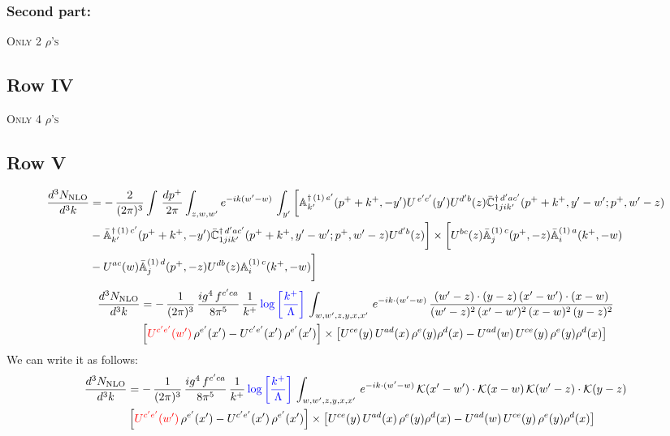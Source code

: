 \documentclass[9pt]{article}
\def\mf#1{\mathbb{#1}}
\newcommand{\chg}[1]{{\color{red}#1}}
\numberwithin{equation}{section}
\begin{document}
\subsubsection{Second part:}
\textsc{Only 2 $\rho$'s}
\subsection{Row IV}
\textsc{Only 4 $\rho$'s}
\subsection{Row V}
\begin{align}
 \frac{d^{3}N_{\rm NLO}}{d^{3}k} & =   -\,\frac{2}{(2\pi)^{3}} \int\, \frac{dp^{+}}{2\pi}\int_{z,w,w^{\prime}} e^{-ik(w^{\prime}-w)}\,\int_{y^{\prime}}\bigg[\mf{A}^{\dagger\, (1)\,e^{\prime}}_{k^{\prime}}(p^{+}+k^{+},-y^{\prime})U^{\, e^{\prime}c^{\prime}}(y^{\prime})U^{d^{\prime}b}(z) \Bar{\mf{C}}^{\dagger\, d^{\prime}ac^{\prime}}_{1jik^{\prime}}(p^{+}+k^{+},y^{\prime}-w^{\prime}; p^{+},w^{\prime}-z) \notag \\ & -\Bar{\mf{A}}^{\dagger\, (1)\,c^{\prime}}_{k^{\prime}}(p^{+}+k^{+},-y^{\prime}) \Bar{\mf{C}}^{\dagger\, d^{\prime}ac^{\prime}}_{1jik^{\prime}}(p^{+}+k^{+},y^{\prime}-w^{\prime}; p^{+},w^{\prime}-z)U^{d^{\prime}b}(z)\bigg] \times  \bigg[U^{bc}(z)\Bar{\mf{A}}^{(1)\, c}_{j}(p^{+},-z)\Bar{\mf{A}}^{(1)\, a}_{i}(k^{+},-w)\notag \\ & -U^{ac}(w) \Bar{\mf{A}}^{(1)\, d}_{j}(p^{+},-z)U^{db}(z) \mf{A}^{(1)\, c}_{i}(k^{+},- w)\bigg]\nonumber
\end{align}
\begin{align}
 \frac{d^{3}N_{\rm NLO}}{d^{3}k} & =    -\,\frac{1}{(2\pi)^{3}}\, \frac{ig^{4}\,f^{c'ca}}{8\pi^{5}}\, \frac{1}{k^{+}}\,{\color{blue}\log{\left[\frac{k^{+}}{\Lambda}\right]}}\, \int_{w,w',z,y,x,x'}\, e^{-ik\cdot (w'-w)}\,\frac{(w'-z)\cdot (y-z)\,(x'-w')\cdot (x-w)}{(w'-z)^{2}\,(x'-w')^{2}\,(x-w)^{2}\,(y-z)^{2}}\notag \\ & \left[\chg{U^{c'e'}(w')}\,\rho^{e'}(x')-U^{c'e'}(x')\,\rho^{e'}(x')\right]\times  \left[U^{ce}(y)\,U^{ad}(x)\,\rho^{e}(y)\rho^{d}(x)-U^{ad}(w)\,U^{ce}(y)\,\rho^{e}(y)\rho^{d}(x)\right]
\end{align}
We can write it as follows: 
\begin{align}
 \frac{d^{3}N_{\rm NLO}}{d^{3}k} & =    -\,\frac{1}{(2\pi)^{3}}\, \frac{ig^{4}\,f^{c'ca}}{8\pi^{5}}\, \frac{1}{k^{+}}\,{\color{blue}\log{\left[\frac{k^{+}}{\Lambda}\right]}}\, \int_{w,w',z,y,x,x'}\, e^{-ik\cdot (w'-w)}\,\mathcal{K}(x'-w')\cdot \mathcal{K}(x-w)\,\mathcal{K}(w'-z)\cdot \mathcal{K}(y-z)\notag \\ & \left[\chg{U^{c'e'}(w')}\,\rho^{e'}(x')-U^{c'e'}(x')\,\rho^{e'}(x')\right]\times  \left[U^{ce}(y)\,U^{ad}(x)\,\rho^{e}(y)\rho^{d}(x)-U^{ad}(w)\,U^{ce}(y)\,\rho^{e}(y)\rho^{d}(x)\right]
\end{align}
\end{document}
